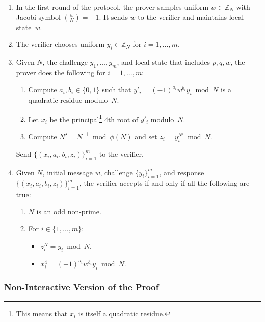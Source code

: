 \documentclass[11pt]{article}
\newcommand{\?}[1]{\stackrel{?}{#1}}
\begin{document}
\begin{enumerate} 
\item In the first round of the protocol, the prover samples uniform 
$w \in \mathbb{Z}_N$
    with Jacobi symbol $\left( \frac{w}{N} \right) = -1$. It sends $w$ to the verifier and maintains local state~$w$.

  \item The verifier chooses uniform $y_i \in \mathbb{Z}_N$ for $i=1,\ldots, m$.

  \item Given $N$, the challenge $y_1, \ldots, y_m$, and local state that includes $p, q, w$, the prover does the following for $i=1,\ldots,m$:
    \begin{enumerate}
      \item Compute $a_i, b_i \in \{0,1\}$ such that $y'_i = (-1)^{a_i} w^{b_i} y_i \bmod N$ is a quadratic residue  modulo~$N$.
      \item Let $x_i$ be the principal\footnote{This means that $x_i$ is itself a quadratic residue.} 4th root of $y'_i$ modulo~$N$.
      \item Compute $N' = N^{-1} \bmod \phi(N)$ and set $z_i = y_i ^ {N'} \bmod N$.
    \end{enumerate}
Send $\{(x_i, a_i, b_i, z_i)\}_{i=1}^m$ to the verifier. 
    
  \item Given $N$, initial message $w$, challenge $\{y_i\}_{i=1}^m$, and response 
  $\{(x_i, a_i, b_i, z_i)\}_{i=1}^m$, the verifier accepts if and only if all the following are true:
    \begin{enumerate}
      \item $N$ is an odd non-prime.
      \item For $i \in \{1, \ldots, m\}$: \begin{itemize}
          \item $z_i^N = y_i \bmod N$.
          \item $x_i^4 = (-1)^{a_i} w^{b_i} y_i \bmod N$.
      \end{itemize} 
    \end{enumerate}

\end{enumerate}

\subsubsection{Non-Interactive Version of the Proof}
\end{document}
